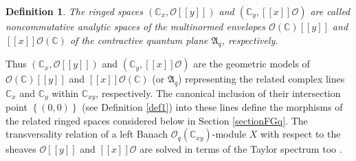 \documentclass[12pt,reqno]{amsart}%
\theoremstyle{plain}
\newtheorem{definition}{Definition}
\numberwithin{theorem}{section} \numberwithin{equation}{section}
\numberwithin{lemma}{section}
\numberwithin{remark}{section}
\numberwithin{example}{section}
\numberwithin{proposition}{section}
\numberwithin{definition}{section}
\numberwithin{corollary}{section}
\begin{document}
\begin{definition}
\label{def2}The ringed spaces $\left(  \mathbb{C}_{x},\mathcal{O}\left[
\left[  y\right]  \right]  \right)  $ and $\left(  \mathbb{C}_{y},\left[
\left[  x\right]  \right]  \mathcal{O}\right)  $ are called noncommutative
analytic spaces of the multinormed envelopes $\mathcal{O}\left(
\mathbb{C}\right)  \left[  \left[  y\right]  \right]  $ and $\left[  \left[
x\right]  \right]  \mathcal{O}\left(  \mathbb{C}\right)  $ of the contractive
quantum plane $\mathfrak{A}_{q}$, respectively.
\end{definition}

Thus $\left(  \mathbb{C}_{x},\mathcal{O}\left[  \left[  y\right]  \right]
\right)  $ and $\left(  \mathbb{C}_{y},\left[  \left[  x\right]  \right]
\mathcal{O}\right)  $ are the geometric models of $\mathcal{O}\left(
\mathbb{C}\right)  \left[  \left[  y\right]  \right]  $ and $\left[  \left[
x\right]  \right]  \mathcal{O}\left(  \mathbb{C}\right)  $ (or $\mathfrak{A}%
_{q}$) representing the related complex lines $\mathbb{C}_{x}$ and
$\mathbb{C}_{y}$ within $\mathbb{C}_{xy}$, respectively. The canonical
inclusion of their intersection point $\left\{  \left(  0,0\right)  \right\}
$ (see Definition \ref{def1}) into these lines define the morphisms of the
related ringed spaces considered below in Section \ref{sectionFGq}. The
transversality relation of a left Banach $\mathcal{O}_{q}\left(
\mathbb{C}_{xy}\right)  $-module $X$ with respect to the sheaves
$\mathcal{O}\left[  \left[  y\right]  \right]  $ and $\left[  \left[
x\right]  \right]  \mathcal{O}$ are solved in terms of the Taylor spectrum too
\cite[Proposition 6.4]{Dosi25}.
\end{document}
